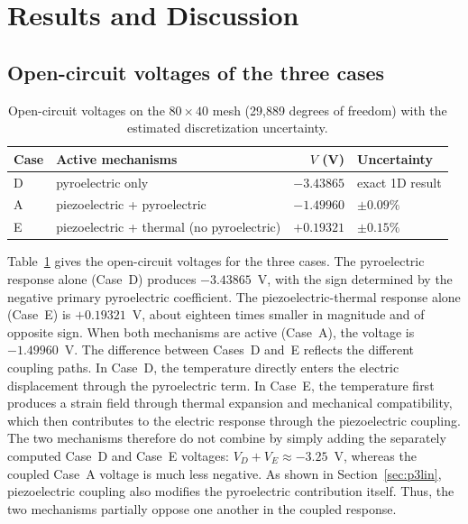 \documentclass[pdflatex,sn-mathphys-num]{sn-jnl}
\begin{document}
\section{Results and Discussion}
\label{sec:results}

\subsection{Open-circuit voltages of the three cases}
\label{sec:voltages}

\begin{table}[t]
\centering
\caption{Open-circuit voltages on the $80\times40$ mesh (29{,}889 degrees of freedom)
with the estimated discretization uncertainty.}
\label{tab:results}
\begin{tabular}{@{}llrl@{}}
\toprule
Case & Active mechanisms & $V$ (V) & Uncertainty \\
\midrule
D & pyroelectric only & $-3.43865$ & exact 1D result \\
A & piezoelectric + pyroelectric & $-1.49960$ & $\pm0.09\%$ \\
E & piezoelectric + thermal (no pyroelectric) & $+0.19321$ & $\pm0.15\%$ \\
\bottomrule
\end{tabular}
\end{table}

Table~\ref{tab:results} gives the open-circuit voltages for the three cases. The
pyroelectric response alone (Case~D) produces $-3.43865$~V, with the sign determined
by the negative primary pyroelectric coefficient. The piezoelectric-thermal response
alone (Case~E) is $+0.19321$~V, about eighteen times smaller in magnitude and of
opposite sign. When both mechanisms are active (Case~A), the voltage is
$-1.49960$~V. The difference between Cases~D and~E reflects the different coupling
paths. In Case~D, the temperature directly enters the electric displacement through
the pyroelectric term. In Case~E, the temperature first produces a strain field
through thermal expansion and mechanical compatibility, which then contributes to the
electric response through the piezoelectric coupling. The two mechanisms therefore
do not combine by simply adding the separately computed Case~D and Case~E voltages:
$V_D+V_E\approx-3.25$~V, whereas the coupled Case~A voltage is much less negative.
As shown in Section~\ref{sec:p3lin}, piezoelectric coupling also modifies the
pyroelectric contribution itself. Thus, the two mechanisms partially oppose one
another in the coupled response.
\end{document}
